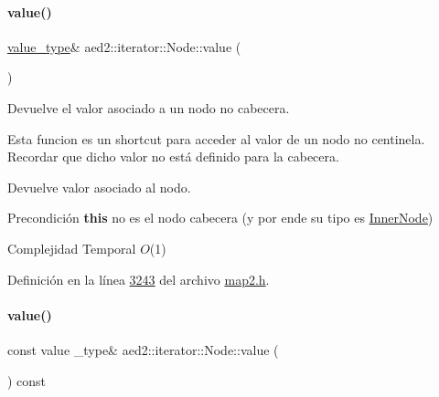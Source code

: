 \paragraph{\texorpdfstring{value()}{value()}\hspace{0.1cm}{\footnotesize\ttfamily [1/2]}}
{\footnotesize\ttfamily \hyperlink{classaed2_1_1iterator_a6411a2c08b2b7c52f063bef1a168acb6_a6411a2c08b2b7c52f063bef1a168acb6}{value\+\_\+type}\& aed2\+::iterator\+::\+Node\+::value (\begin{DoxyParamCaption}{ }\end{DoxyParamCaption})\hspace{0.3cm}{\ttfamily [inline]}}



Devuelve el valor asociado a un nodo no cabecera. 

Esta funcion es un shortcut para acceder al valor de un nodo no centinela. Recordar que dicho valor no está definido para la cabecera.

\begin{DoxyReturn}{Devuelve}
valor asociado al nodo.
\end{DoxyReturn}
\begin{DoxyPrecond}{Precondición}
{\bfseries this} no es el nodo cabecera (y por ende su tipo es \hyperlink{structaed2_1_1iterator_1_1InnerNode}{Inner\+Node})
\end{DoxyPrecond}

\begin{DoxyDescription}
\item[Complejidad Temporal]$O$(1)
\end{DoxyDescription}

Definición en la línea \hyperlink{map2_8h_source_l03243}{3243} del archivo \hyperlink{map2_8h_source}{map2.\+h}.

\mbox{\label{structaed2_1_1iterator_1_1Node_ad96bf1d32de8726678dd95c687f7ee36_ad96bf1d32de8726678dd95c687f7ee36}} 
\paragraph{\texorpdfstring{value()}{value()}\hspace{0.1cm}{\footnotesize\ttfamily [2/2]}}
{\footnotesize\ttfamily const value \+\_\+type\& aed2\+::iterator\+::\+Node\+::value (\begin{DoxyParamCaption}{ }\end{DoxyParamCaption}) const\hspace{0.3cm}{\ttfamily [inline]}}

